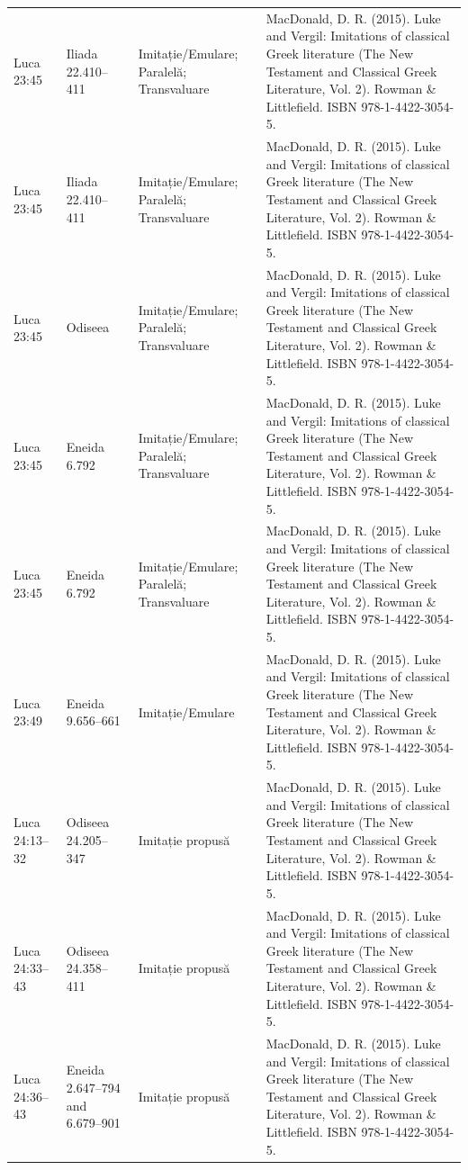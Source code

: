 \documentclass[12pt,a4paper,twoside,openany]{book}
\begin{document}
\begin{longtable}{L{1.4cm}L{1.7cm}L{3.1cm}L{8.4cm}}
Luca 23:45 & Iliada 22.410–411 & Imitație/Emulare; Paralelă; Transvaluare & MacDonald, D. R. (2015). Luke and Vergil: Imitations of classical Greek literature (The New Testament and Classical Greek Literature, Vol. 2). Rowman \& Littlefield. ISBN 978-1-4422-3054-5. \\
Luca 23:45 & Iliada 22.410–411 & Imitație/Emulare; Paralelă; Transvaluare & MacDonald, D. R. (2015). Luke and Vergil: Imitations of classical Greek literature (The New Testament and Classical Greek Literature, Vol. 2). Rowman \& Littlefield. ISBN 978-1-4422-3054-5. \\
Luca 23:45 & Odiseea & Imitație/Emulare; Paralelă; Transvaluare & MacDonald, D. R. (2015). Luke and Vergil: Imitations of classical Greek literature (The New Testament and Classical Greek Literature, Vol. 2). Rowman \& Littlefield. ISBN 978-1-4422-3054-5. \\
Luca 23:45 & Eneida 6.792 & Imitație/Emulare; Paralelă; Transvaluare & MacDonald, D. R. (2015). Luke and Vergil: Imitations of classical Greek literature (The New Testament and Classical Greek Literature, Vol. 2). Rowman \& Littlefield. ISBN 978-1-4422-3054-5. \\
Luca 23:45 & Eneida 6.792 & Imitație/Emulare; Paralelă; Transvaluare & MacDonald, D. R. (2015). Luke and Vergil: Imitations of classical Greek literature (The New Testament and Classical Greek Literature, Vol. 2). Rowman \& Littlefield. ISBN 978-1-4422-3054-5. \\
Luca 23:49 & Eneida 9.656–661 & Imitație/Emulare & MacDonald, D. R. (2015). Luke and Vergil: Imitations of classical Greek literature (The New Testament and Classical Greek Literature, Vol. 2). Rowman \& Littlefield. ISBN 978-1-4422-3054-5. \\
Luca 24:13–32 & Odiseea 24.205–347 & Imitație propusă & MacDonald, D. R. (2015). Luke and Vergil: Imitations of classical Greek literature (The New Testament and Classical Greek Literature, Vol. 2). Rowman \& Littlefield. ISBN 978-1-4422-3054-5. \\
Luca 24:33–43 & Odiseea 24.358–411 & Imitație propusă & MacDonald, D. R. (2015). Luke and Vergil: Imitations of classical Greek literature (The New Testament and Classical Greek Literature, Vol. 2). Rowman \& Littlefield. ISBN 978-1-4422-3054-5. \\
Luca 24:36–43 & Eneida 2.647–794 and 6.679–901 & Imitație propusă & MacDonald, D. R. (2015). Luke and Vergil: Imitations of classical Greek literature (The New Testament and Classical Greek Literature, Vol. 2). Rowman \& Littlefield. ISBN 978-1-4422-3054-5. \\

\end{longtable}
\end{document}

